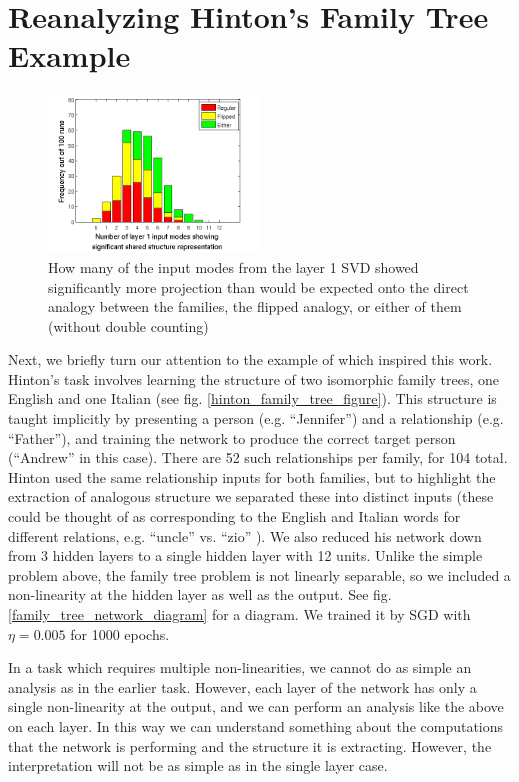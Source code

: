 \documentclass[10pt,letterpaper]{article}
\begin{document}
\section{Reanalyzing Hinton's Family Tree Example}
\begin{figure}
\centering
\includegraphics[width=0.5\textwidth]{figures/ft_input_mode_significance_hist.png}
\caption{How many of the input modes from the layer 1 SVD showed significantly more projection than would be expected onto the direct analogy between the families, the flipped analogy, or either of them (without double counting)}
\label{ft_input_mode_sig_hist}
\end{figure}
Next, we briefly turn our attention to the example of \citet{Hinton1986} which inspired this work. Hinton's task involves learning the structure of two isomorphic family trees, one English and one Italian (see fig. \ref{hinton_family_tree_figure}). This structure is taught implicitly by presenting a person (e.g. ``Jennifer'') and a relationship (e.g. ``Father''), and training the network to produce the correct target person (``Andrew'' in this case). There are 52 such relationships per family, for 104 total. Hinton used the same relationship inputs for both families, but to highlight the extraction of analogous structure we separated these into distinct inputs (these could be thought of as corresponding to the English and Italian words for different relations, e.g. ``uncle'' vs. ``zio'' ). We also reduced his network down from 3 hidden layers to a single hidden layer with 12 units. Unlike the simple problem above, the family tree problem is not linearly separable, so we included a non-linearity at the hidden layer as well as the output. See fig. \ref{family_tree_network_diagram} for a diagram. We trained it by SGD with \(\eta = 0.005\) for 1000 epochs. \par 
In a task which requires multiple non-linearities, we cannot do as simple an analysis as in the earlier task. However, each layer of the network has only a single non-linearity at the output, and we can perform an analysis like the above on each layer. In this way we can understand something about the computations that the network is performing and the structure it is extracting. However, the interpretation will not be as simple as in the single layer case. \par
\end{document}
